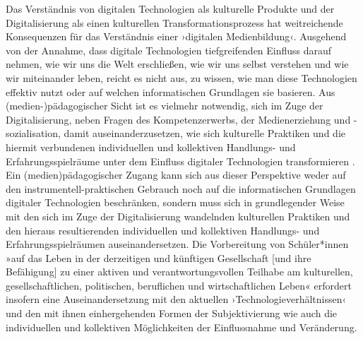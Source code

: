 \documentclass[
  a4paper,
]{book}
\begin{document}
Das Verständnis von digitalen Technologien als kulturelle Produkte und der Digitalisierung als einen kulturellen Transformationsprozess hat weitreichende Konsequenzen für das Verständnis einer ›digitalen Medienbildung‹. Ausgehend von der Annahme, dass digitale Technologien tiefgreifenden Einfluss darauf nehmen, wie wir uns die Welt erschließen, wie wir uns selbst verstehen und wie wir miteinander leben, reicht es nicht aus, zu wissen, wie man diese Technologien effektiv nutzt oder auf welchen informatischen Grundlagen sie basieren. Aus (medien-)pädagogischer Sicht ist es vielmehr notwendig, sich im Zuge der Digitalisierung, neben Fragen des Kompetenzerwerbs, der Medienerziehung und -sozialisation, damit auseinanderzusetzen, wie sich kulturelle Praktiken und die hiermit verbundenen individuellen und kollektiven Handlungs- und Erfahrungsspielräume unter dem Einfluss digitaler Technologien transformieren \citep{munte-goussarMedienbildungSchulkulturUnd2016}. Ein (medien)pädagogischer Zugang kann sich aus dieser Perspektive weder auf den instrumentell-praktischen Gebrauch noch auf die informatischen Grundlagen digitaler Technologien beschränken, sondern muss sich in grundlegender Weise mit den sich im Zuge der Digitalisierung wandelnden kulturellen Praktiken und den hieraus resultierenden individuellen und kollektiven Handlungs- und Erfahrungsspielräumen auseinandersetzen. Die Vorbereitung von Schüler*innen »auf das Leben in der derzeitigen und künftigen Gesellschaft {[}und ihre Befähigung{]} zu einer aktiven und verantwortungsvollen Teilhabe am kulturellen, gesellschaftlichen, politischen, beruflichen und wirtschaftlichen Leben« \citep{kultusministerkonferenzBildungDigitalenWelt2016} erfordert insofern eine Auseinandersetzung mit den aktuellen ›Technologieverhältnissen‹ \citep{zornSelbstWeltUnd2014} und den mit ihnen einhergehenden Formen der Subjektivierung wie auch die individuellen und kollektiven Möglichkeiten der Einflussnahme und Veränderung.
\end{document}
